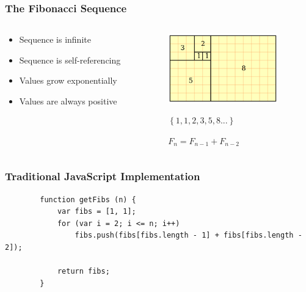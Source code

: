 \documentclass{beamer}
\begin{document}
    \begin{frame}
        \frametitle{The Fibonacci Sequence}

        \begin{columns}[c]
            \begin{column}[T]{5cm}
                \begin{itemize}
                    \item Sequence is infinite
                    \item Sequence is self-referencing
                    \item Values grow exponentially
                    \item Values are always positive
                \end{itemize}
            \end{column}
            \begin{column}[T]{5cm}
                \begin{figure}
                    \centering
                    \includegraphics[height=3cm]{./fibs/images/FibonacciBlocks.png}
                \end{figure}

                \begin{figure}
                    \centering
                    \begin{math}
                        \left\{1,1,2,3,5,8...\right\}
                    \end{math}
                \end{figure}
               
                \begin{figure}
                    \centering
                    \begin{math}
                        F_{n} = F_{n-1} + F_{n-2}
                    \end{math}
                \end{figure}
            \end{column}
        \end{columns}
    \end{frame}

    \lstset{language=JavaScript}
    \begin{frame}[fragile=singleslide]
        \frametitle{Traditional JavaScript Implementation}

        \begin{lstlisting}
        function getFibs (n) {
            var fibs = [1, 1];
            for (var i = 2; i <= n; i++) 
                fibs.push(fibs[fibs.length - 1] + fibs[fibs.length - 2]);

            return fibs;
        }
        \end{lstlisting}
    \end{frame}
\end{document}
